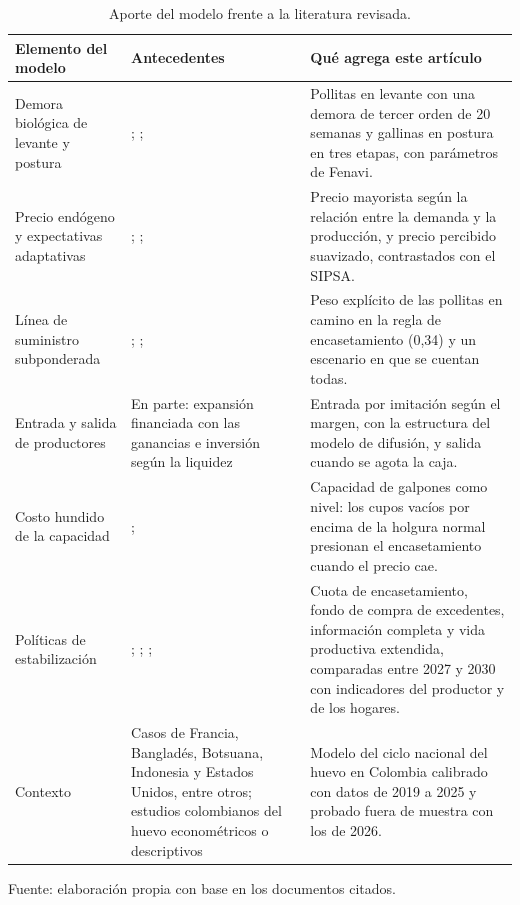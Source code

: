 \documentclass[preprint,12pt,authoryear]{elsarticle}
\begin{document}
\begin{table}[!htbp]
\centering
\caption{Aporte del modelo frente a la literatura revisada.}
\label{tab:aporte}
\footnotesize
\setlength{\tabcolsep}{4pt}
\begin{tabularx}{\textwidth}{@{}P{2.5cm}P{3.7cm}L@{}}
\toprule
Elemento del modelo & Antecedentes & Qué agrega este artículo \\
\midrule
Demora biológica de levante y postura & \citet{Meadows1969}; \citet{Rosen1994}; \citet{Haryana2026} & Pollitas en levante con una demora de tercer orden de 20 semanas y gallinas en postura en tres etapas, con parámetros de Fenavi. \\
\addlinespace
Precio endógeno y expectativas adaptativas & \citet{Ezekiel1938}; \citet{Nerlove1958}; \citet{Chavas1999} & Precio mayorista según la relación entre la demanda y la producción, y precio percibido suavizado, contrastados con el SIPSA. \\
\addlinespace
Línea de suministro subponderada & \citet{Sterman1989b}; \citet{CrosonDonohue2006}; \citet{ArangoMoxnes2012} & Peso explícito de las pollitas en camino en la regla de encasetamiento (0,34) y un escenario en que se cuentan todas. \\
\addlinespace
Entrada y salida de productores & En parte: expansión financiada con las ganancias \citep{Yuzaria2025} e inversión según la liquidez \citep{BergHuffaker2015} & Entrada por imitación según el margen, con la estructura del modelo de difusión, y salida cuando se agota la caja. \\
\addlinespace
Costo hundido de la capacidad & \citet{ArangoMoxnes2012}; \citet{BergHuffaker2015} & Capacidad de galpones como nivel: los cupos vacíos por encima de la holgura normal presionan el encasetamiento cuando el precio cae. \\
\addlinespace
Políticas de estabilización & \citet{Cardwell2015}; \citet{AlonsoCifuentes2017}; \citet{TraoreDoyon2023}; \citet{Haryana2026} & Cuota de encasetamiento, fondo de compra de excedentes, información completa y vida productiva extendida, comparadas entre 2027 y 2030 con indicadores del productor y de los hogares. \\
\addlinespace
Contexto & Casos de Francia, Bangladés, Botsuana, Indonesia y Estados Unidos, entre otros; estudios colombianos del huevo econométricos o descriptivos & Modelo del ciclo nacional del huevo en Colombia calibrado con datos de 2019 a 2025 y probado fuera de muestra con los de 2026. \\
\bottomrule
\end{tabularx}

\smallskip
{\footnotesize\raggedright Fuente: elaboración propia con base en los documentos citados.\par}
\end{table}
\end{document}
